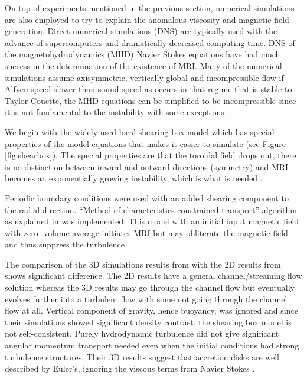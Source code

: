 \documentclass{jfm}
\begin{document}
On top of experiments mentioned in the previous section, numerical simulations
are also employed to try to explain the anomalous viscosity and magnetic field
generation. Direct numerical simulations (DNS) are typically used with the
advance of supercomputers and dramatically decreased computing time. DNS of the
magnetohydrodynamics (MHD) Navier Stokes equations have had much success in the
determination of the existence of MRI. Many of the numerical simulations assume
axisymmetric, vertically global and incompressible flow if Alfven speed slower
than sound speed as occurs in that regime that is stable to Taylor-Couette, the
MHD equations can be simplified to be incompressible since it is not
fundamental to the instability \citep{Balbus1991} with some exceptions
\citep{Sano1998}. 

We begin with the widely used local shearing box model \citep{Balbus1991} which
has special properties of the model equations that makes it easier to simulate
(see Figure \ref{fig:shearbox}). The special properties are that the toroidal
field drops out, there is no distinction between inward and outward directions
(symmetry) and MRI becomes an exponentially growing instability, which is what
is needed \citep{Julien2010}. 

Periodic boundary conditions were used with an added shearing component to the
radial direction. ``Method of characteristics-constrained transport'' algorithm
as explained in \cite{Hawley1995} was implemented. This model with an initial
input magnetic field with zero- volume average initiates MRI but may obliterate
the magnetic field and thus suppress the turbulence. 

The comparison of the 3D simulations results from \cite{Hawley1995} with the 2D
results from \cite{Balbus1994} shows significant difference. The 2D results
have a general channel/streaming flow solution whereas the 3D results may go
through the channel flow but eventually evolves further into a turbulent flow
with some not going through the channel flow at all. Vertical component of
gravity, hence buoyancy, was ignored and since their simulations showed
significant density contrast, the shearing box model is not self-consistent.
Purely hydrodynamic turbulence did not give significant angular momentum
transport needed even when the initial conditions had strong turbulence
structures. Their 3D results suggest that accretion disks are well described by
Euler's, ignoring the viscous terms from Navier Stokes \citep{Hawley1995}.
\end{document}
